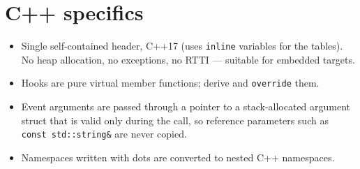 \documentclass[11pt,a4paper,openany]{report}
\newcommand{\code}[1]{\texttt{#1}}
\begin{document}




\section{C++ specifics}
\begin{itemize}[itemsep=1pt]
  \item Single self-contained header, C++17 (uses \code{inline} variables for the tables). No heap
        allocation, no exceptions, no RTTI --- suitable for embedded targets.
  \item Hooks are pure virtual member functions; derive and \code{override} them.
  \item Event arguments are passed through a pointer to a stack-allocated argument struct that is
        valid only during the call, so reference parameters such as \code{const std::string\&} are
        never copied.
  \item Namespaces written with dots are converted to nested C++ namespaces.
\end{itemize}
\end{document}
